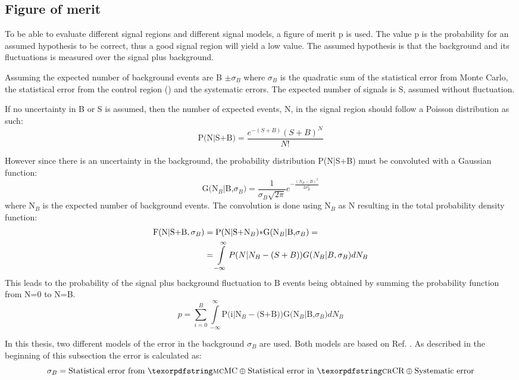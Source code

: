 \subsection{Figure of merit}
To be able to evaluate different signal regions and different signal models, a figure of merit p is used. The value p is the probability for an assumed hypothesis to be correct, thus a good signal region will yield a low value. The assumed hypothesis is that the background and its fluctuations is measured over the signal plus background.

Assuming the expected number of background events are B $\pm \sigma_B$ where $\sigma_B$ is the quadratic sum of the statistical error from Monte Carlo, the statistical error from the control region (\abbrCR) and the systematic errors. The expected number of signals is S, assumed without fluctuation. 

If no uncertainty in B or S is assumed, then the number of expected events, N, in the signal region should follow a Poisson distribution as such:
\begin{equation}
\text{P(N|S+B)}=\frac{e^{-(S+B)}(S+B)^N}{N!}
\end{equation} 

However since there is an uncertainty in the background, the probability distribution P(N|S+B) must be convoluted with a Gaussian function:
\begin{equation}
 \text{G(N$_B$|B,$\sigma_B$)}=\frac{1}{\sigma_B \sqrt{2 \pi}} e^{-\frac{(N_B-B)^2}{2\sigma_B^2}}
\end{equation}
where N$_B$ is the expected number of background events. The convolution is done using N$_B$ as N resulting in the total probability density function:
\begin{align}
\text{F(N|S+B},\sigma_B) &= \text{P(N|S+N$_B$)$\ast$G(N$_B$|B,$\sigma_B$)}= \notag \\
&=\int\limits_{-\infty}^{\infty}P(N|N_B - (S+B))G(N_B|B,\sigma_B) dN_B
\end{align}
This leads to the probability of the signal plus background fluctuation to B events being obtained by summing the probability function from N=0 to N=B.
\begin{equation}
p = \sum\limits_{i=0}^{B} \int\limits_{-\infty}^{\infty} \text{P(i|N$_B - $(S+B))G(N$_B$|B,$\sigma_B$)} dN_B
\end{equation}

In this thesis, two different models of the error in the background $\sigma_B$ are used.   
Both models are based on Ref. \citep{ATLAS-CONF-2012-147}. As described in the beginning of this subsection the error is calculated as:
\begin{equation*}
\sigma_B = \text{Statistical error from \abbrMC} \oplus \text{Statistical error in \abbrCR} \oplus \text{Systematic error}
\end{equation*}

